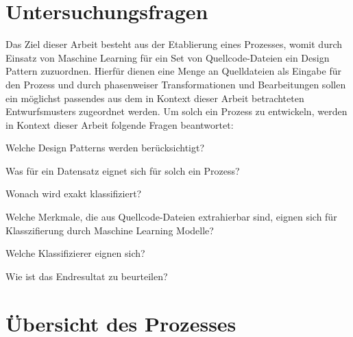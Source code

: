 \newpage

\section{Untersuchungsfragen}

Das Ziel dieser Arbeit besteht aus der Etablierung eines Prozesses, womit durch Einsatz von Maschine Learning für ein Set von Quellcode-Dateien ein Design Pattern zuzuordnen.
Hierfür dienen eine Menge an Quelldateien als Eingabe für den Prozess und durch phasenweiser Transformationen und Bearbeitungen sollen ein möglichst passendes aus dem in Kontext dieser Arbeit betrachteten Entwurfsmusters zugeordnet werden.
Um solch ein Prozess zu entwickeln, werden in Kontext dieser Arbeit folgende Fragen beantwortet:

\begin{questions}
    \item Welche Design Patterns werden berücksichtigt?
    \item Was für ein Datensatz eignet sich für solch ein Prozess?
    \item Wonach wird exakt klassifiziert?
    \item Welche Merkmale, die aus Quellcode-Dateien extrahierbar sind, eignen sich für Klasszifierung durch Maschine Learning Modelle?  
    \item Welche Klassifizierer eignen sich?
    \item Wie ist das Endresultat zu beurteilen?
\end{questions}

\section{Übersicht des Prozesses}

